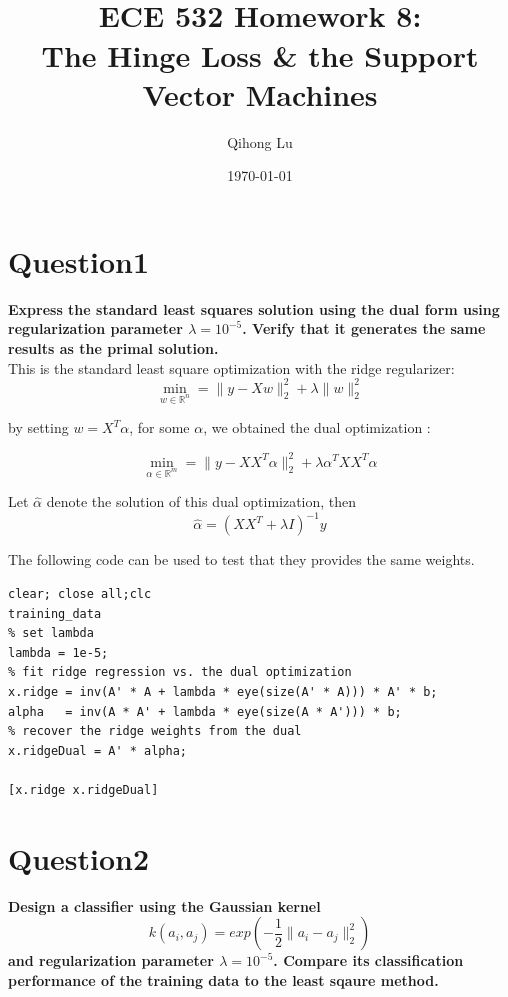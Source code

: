 \documentclass[paper=a4, fontsize=11pt]{scrartcl} %
\title{	
\normalfont \normalsize 
\horrule{0.5pt} \\[0.4cm] %
\huge ECE 532 Homework 8: \\ The Hinge Loss \& the Support Vector Machines
\horrule{2pt} \\[0.5cm] %
}
\author{Qihong Lu} %
\date{\normalsize\today} %
\numberwithin{equation}{section} %
\numberwithin{figure}{section} %
\numberwithin{table}{section} %
\begin{document}
\maketitle %

\section*{Question1}
\textbf{Express the standard least squares solution using the dual form using regularization parameter $\lambda = 10^{-5}$. Verify that it generates the same results as the primal solution.}\\


This is the standard least square optimization with the ridge regularizer: 
$$
\displaystyle \min_{w \in \mathbb{R}^n} = \| y - Xw \|_2^2 + \lambda \| w \|_2^2
$$ 

by setting $w = X^T \alpha$, for some $\alpha$, we obtained the dual optimization : 

$$
\displaystyle \min_{\alpha \in \mathbb{R}^m} = \| y - XX^T \alpha \|_2^2 + \lambda \alpha^T X X ^T\alpha
$$ 

Let $\hat{\alpha}$ denote the solution of this dual optimization, then
$$
\hat{\alpha} = (XX^T + \lambda I)^{-1} y
$$

The following code can be used to test that they provides the same weights. 

\begin{lstlisting}
clear; close all;clc
training_data
% set lambda 
lambda = 1e-5;
% fit ridge regression vs. the dual optimization 
x.ridge = inv(A' * A + lambda * eye(size(A' * A))) * A' * b;
alpha   = inv(A * A' + lambda * eye(size(A * A'))) * b;
% recover the ridge weights from the dual
x.ridgeDual = A' * alpha;

[x.ridge x.ridgeDual]
\end{lstlisting}

\newpage
\section*{Question2}
\textbf{Design a classifier using the Gaussian kernel}
$$ k(a_i,a_j) = exp(-\frac{1}{2}\| a_i-a_j \|_2^2) $$
\textbf{and regularization parameter $\lambda = 10^{-5}$. Compare its classification performance of the training data to the least sqaure method. }\\
\end{document}
